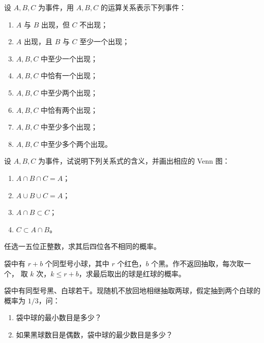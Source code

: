 \begin{homework}[1.2]
设 $A,B,C$ 为事件，用 $A,B,C$ 的运算关系表示下列事件：

\begin{enumerate}
  \item $A$ 与 $B$ 出现，但 $C$ 不出现；
  \item $A$ 出现，且 $B$ 与 $C$ 至少一个出现；
  \item $A,B,C$ 中至少一个出现；
  \item $A,B,C$ 中恰有一个出现；
  \item $A,B,C$ 中至少两个出现；
  \item $A,B,C$ 中恰有两个出现；
  \item $A,B,C$ 中至少多个出现；
  \item $A,B,C$ 中至少多个两个出现。
\end{enumerate}
\end{homework}

\begin{homework}[1.3]
设 $A,B,C$ 为事件，试说明下列关系式的含义，并画出相应的 Venn 图：

\begin{enumerate}
  \item $A \cap B \cap C = A$；
  \item $A \cup B \cup C = A$；
  \item $A \cap B \subset C$；
  \item $C \subset A \cap B$。
\end{enumerate}
\end{homework}

\begin{homework}[1.4]
任选一五位正整数，求其后四位各不相同的概率。
\end{homework}

\begin{homework}[1.5]
袋中有 $r+b$ 个同型号小球，其中 $r$ 个红色，$b$ 个黑。作不返回抽取，每次取一个，
取 $k$ 次，$k \le r+b$，求最后取出的球是红球的概率。
\end{homework}

\begin{homework}[1.6]
袋中有同型号黑、白球若干。现随机不放回地相继抽取两球，假定抽到两个白球的概率为 $1/3$，问：

\begin{enumerate}
  \item 袋中球的最小数目是多少？
  \item 如果黑球数目是偶数，袋中球的最少数目是多少？
\end{enumerate}
\end{homework}


